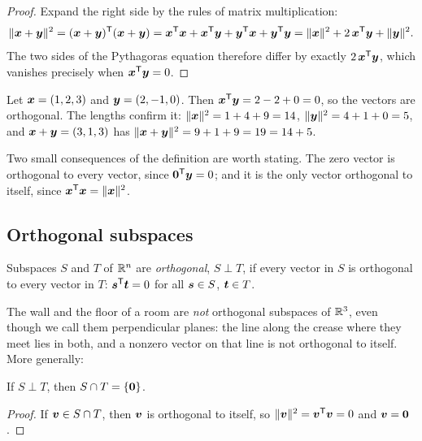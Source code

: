 \begin{proof}
Expand the right side by the rules of matrix multiplication:
\[
  \|\boldsymbol{x}+\boldsymbol{y}\|^2=(\boldsymbol{x}+\boldsymbol{y})^{\mathsf{T}}(\boldsymbol{x}+\boldsymbol{y})
  =\boldsymbol{x}^{\mathsf{T}}\boldsymbol{x}+\boldsymbol{x}^{\mathsf{T}}\boldsymbol{y}+\boldsymbol{y}^{\mathsf{T}}\boldsymbol{x}+\boldsymbol{y}^{\mathsf{T}}\boldsymbol{y}
  =\|\boldsymbol{x}\|^2+2\,\boldsymbol{x}^{\mathsf{T}}\boldsymbol{y}+\|\boldsymbol{y}\|^2 .
\]
The two sides of the Pythagoras equation therefore differ by exactly $2\,\boldsymbol{x}^{\mathsf{T}}\boldsymbol{y}$,
which vanishes precisely when $\boldsymbol{x}^{\mathsf{T}}\boldsymbol{y}=0$.
\end{proof}

\begin{example}\label{ex:u16-pythagoras}
Let $\boldsymbol{x}=(1,2,3)$ and $\boldsymbol{y}=(2,-1,0)$. Then $\boldsymbol{x}^{\mathsf{T}}\boldsymbol{y}=2-2+0=0$, so the vectors
are orthogonal. The lengths confirm it:
$\|\boldsymbol{x}\|^2=1+4+9=14$, $\|\boldsymbol{y}\|^2=4+1+0=5$, and $\boldsymbol{x}+\boldsymbol{y}=(3,1,3)$ has
$\|\boldsymbol{x}+\boldsymbol{y}\|^2=9+1+9=19=14+5$.
\end{example}

Two small consequences of the definition are worth stating. The zero vector is orthogonal to
every vector, since $\boldsymbol{0}^{\mathsf{T}}\boldsymbol{y}=0$; and it is the only vector orthogonal to itself, since
$\boldsymbol{x}^{\mathsf{T}}\boldsymbol{x}=\|\boldsymbol{x}\|^2$.

\subsection{Orthogonal subspaces}

\begin{definition}\label{def:u16-orthsub}
Subspaces $S$ and $T$ of $\mathbb{R}^n$ are \emph{orthogonal}, $S\perp T$, if every vector in $S$ is
orthogonal to every vector in $T$: $\boldsymbol{s}^{\mathsf{T}}\boldsymbol{t}=0$ for all $\boldsymbol{s}\in S$, $\boldsymbol{t}\in T$.
\end{definition}

The wall and the floor of a room are \emph{not} orthogonal subspaces of $\mathbb{R}^3$, even though we
call them perpendicular planes: the line along the crease where they meet lies in both, and a
nonzero vector on that line is not orthogonal to itself. More generally:

\begin{proposition}\label{prop:u16-meet}
If $S\perp T$, then $S\cap T=\{\boldsymbol{0}\}$.
\end{proposition}

\begin{proof}
If $\boldsymbol{v}\in S\cap T$, then $\boldsymbol{v}$ is orthogonal to itself, so
$\|\boldsymbol{v}\|^2=\boldsymbol{v}^{\mathsf{T}}\boldsymbol{v}=0$ and $\boldsymbol{v}=\boldsymbol{0}$.
\end{proof}

